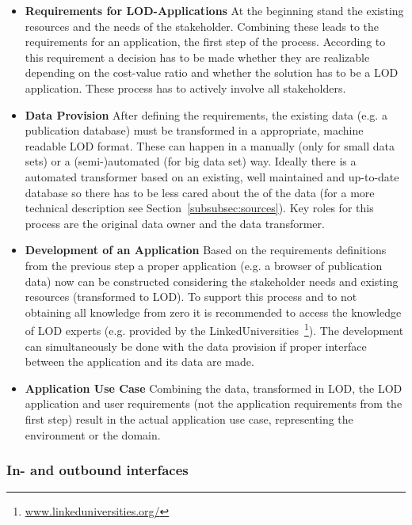 \begin{itemize}
	\item \textbf{Requirements for LOD-Applications}\newline
	At the beginning stand the existing resources and the needs of the stakeholder. Combining these leads to the requirements for an application, the first step of the process. According to this requirement a decision has to be made whether they are realizable depending on the cost-value ratio and whether the solution has to be a LOD application. These process has to actively involve all stakeholders.
	\item \textbf{Data Provision}\newline
	After defining the requirements, the existing data (e.g. a publication database) must be transformed in a appropriate, machine readable LOD format. These can happen in a manually (only for small data sets) or a (semi-)automated (for big data set) way. Ideally there is a automated transformer based on an existing, well maintained and up-to-date database so there has to be less cared about the of the data (for a more technical description see Section~\ref{subsubsec:sources}). Key roles for this process are the original data owner and the data transformer.
	\item \textbf{Development of an Application}\newline
	Based on the requirements definitions from the previous step a proper application (e.g. a browser of publication data) now can be constructed considering the stakeholder needs and existing resources (transformed to LOD).  To support this process and to not obtaining all knowledge from zero it is recommended to access the knowledge of LOD experts (e.g. provided by the LinkedUniversities~\footnote{\url{www.linkeduniversities.org/}}). The development can simultaneously be done with the data provision if proper interface between the application and its data are made. 
	\item \textbf{Application Use Case}\newline
	Combining the data, transformed in LOD, the LOD application and user requirements (not the application requirements from the first step) result in the actual application use case, representing the environment or the domain.
\end{itemize}

\subsubsection{In- and outbound interfaces}

